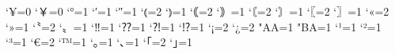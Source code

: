\inhibitxspcode`¥=0%
\inhibitxspcode`￥=0%
\inhibitxspcode`°=1
\inhibitxspcode`′=1
\inhibitxspcode`″=1
\inhibitxspcode`⦅=2
\inhibitxspcode`⦆=1
\inhibitxspcode`｟=2
\inhibitxspcode`｠=1
\inhibitxspcode`〘=2
\inhibitxspcode`〙=1
\inhibitxspcode`〖=2
\inhibitxspcode`〗=1
\inhibitxspcode`«=2
\inhibitxspcode`»=1
\inhibitxspcode`〝=2
\inhibitxspcode`〟=1
\inhibitxspcode`‼=1
\inhibitxspcode`⁇=1
\inhibitxspcode`⁈=1
\inhibitxspcode`⁉=1
\inhibitxspcode`¡=2
\inhibitxspcode`¿=2
\inhibitxspcode"AA=1
\inhibitxspcode"BA=1
\inhibitxspcode`¹=1
\inhibitxspcode`²=1
\inhibitxspcode`³=1
\inhibitxspcode`€=2
\inhibitxspcode`™=1
\inhibitxspcode`｡=1
\inhibitxspcode`､=1
\inhibitxspcode`｢=2
\inhibitxspcode`｣=1
\endinput
